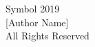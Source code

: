 

\newcommand{\CopyrightYear}{2019}


\begin{titlepage}
	\begin{singlespacing}
		\begin{center}
			
			\vspace*{35\baselineskip}
			
			Symbol \CopyrightYear\\
			\vspace{\baselineskip}	
			[Author Name]\\
			\vspace{\baselineskip}	
			All Rights Reserved
		\end{center}
		\vfill
		
	\end{singlespacing}
\end{titlepage}
